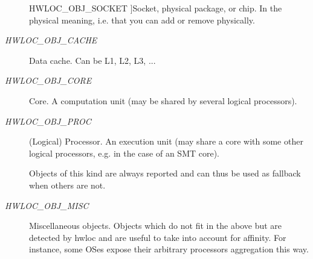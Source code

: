 \begin{Desc}
\begin{description}
{\hypertarget{group__hwlocality__types_ggcd37bb612667dc437d66bfb175a8dc551ac6e07775ae4324b3fe9dbd72c785ec}{
HWLOC\_\-OBJ\_\-SOCKET}
\label{group__hwlocality__types_ggcd37bb612667dc437d66bfb175a8dc551ac6e07775ae4324b3fe9dbd72c785ec}
}]Socket, physical package, or chip. In the physical meaning, i.e. that you can add or remove physically. \item[{\em 
\hypertarget{group__hwlocality__types_ggcd37bb612667dc437d66bfb175a8dc5556ee0b7eca88f363b75b34fdde8c9ddc}{
HWLOC\_\-OBJ\_\-CACHE}
\label{group__hwlocality__types_ggcd37bb612667dc437d66bfb175a8dc5556ee0b7eca88f363b75b34fdde8c9ddc}
}]Data cache. Can be L1, L2, L3, ... \item[{\em 
\hypertarget{group__hwlocality__types_ggcd37bb612667dc437d66bfb175a8dc55c793958f330bca371aa1535de8aff45f}{
HWLOC\_\-OBJ\_\-CORE}
\label{group__hwlocality__types_ggcd37bb612667dc437d66bfb175a8dc55c793958f330bca371aa1535de8aff45f}
}]Core. A computation unit (may be shared by several logical processors). \item[{\em 
\hypertarget{group__hwlocality__types_ggcd37bb612667dc437d66bfb175a8dc555e0ccbbd5922cbb07b53fe892b91b8f2}{
HWLOC\_\-OBJ\_\-PROC}
\label{group__hwlocality__types_ggcd37bb612667dc437d66bfb175a8dc555e0ccbbd5922cbb07b53fe892b91b8f2}
}](Logical) Processor. An execution unit (may share a core with some other logical processors, e.g. in the case of an SMT core). 

Objects of this kind are always reported and can thus be used as fallback when others are not. \item[{\em 
\hypertarget{group__hwlocality__types_ggcd37bb612667dc437d66bfb175a8dc5519f8a6953fa91efc76bcbcdf2d22de4d}{
HWLOC\_\-OBJ\_\-MISC}
\label{group__hwlocality__types_ggcd37bb612667dc437d66bfb175a8dc5519f8a6953fa91efc76bcbcdf2d22de4d}
}]Miscellaneous objects. Objects which do not fit in the above but are detected by hwloc and are useful to take into account for affinity. For instance, some OSes expose their arbitrary processors aggregation this way. \end{description}
\end{Desc}



